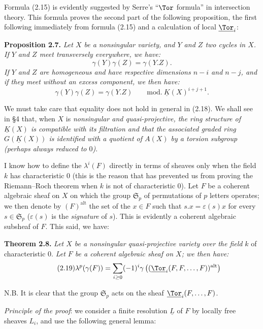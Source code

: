 Formula (2.15) is evidently suggested by Serre's ``$\Tor$ formula'' in intersection theory. This formula proves the second part of the following proposition, the first following immediately from formula (2.15) and a calculation of local $\underline{\Tor}_i$:

\textbf{Proposition 2.7.} \emph{Let $X$ be a nonsingular variety, and $Y$ and $Z$ two cycles in $X$. If $Y$ and $Z$ meet transversely everywhere, we have:}
\begin{equation}\tag{2.17}
 \gamma(Y)\gamma(Z)=\gamma(Y.Z).
\end{equation}
\emph{If $Y$ and $Z$ are homogeneous and have respective dimensions $n-i$ and $n-j$, and if they meet without an excess component, we then have:}
%
\begin{equation}\tag{2.18}
 \gamma(Y)\gamma(Z)=\gamma(Y.Z)\qquad\mathrm{mod.}\ \underline K(X)^{i+j+1}.
\end{equation}

We
must take care that equality does not hold in general in (2.18). We shall see in \S 4 that, when $X$ is \emph{nonsingular and quasi-projective, the ring structure of $\underline K(X)$ is compatible with its filtration and that the associated graded ring $G(\underline K(X))$ is identified with a quotient of $A(X)$ by a torsion subgroup (perhaps always reduced to $0$)}.

I know how to define the $\lambda^i(F)$ directly in terms of sheaves only when the field $k$ has characteristic $0$ (this is the reason that has prevented us from proving the Riemann--Roch theorem when $k$ is not of characteristic $0$). Let $F$ be a coherent algebraic sheaf on $X$ on which the group $\mathfrak S_p$ of permutations of $p$ letters operates; we then denote by $(F)^{\mathrm{alt}}$ the set of the $x\in F$ such that $s.x=\varepsilon(s)x$ for every $s\in\mathfrak S_p$ ($\varepsilon(s)$ is the \emph{signature} of $s$). This is evidently a coherent algebraic subsheaf of $F$. This said, we have:

\textbf{Theorem 2.8.} \emph{Let $X$ be a nonsingular quasi-projective variety over the field} $k$ of characteristic $0$. \emph{Let $F$ be a coherent algebraic sheaf on $X$; we then have:}
\begin{equation}\tag{2.19}
 \lambda^p(\gamma(F))=\sum_{i\geq0}(-1)^i\gamma\left((\underline{\Tor}_i(F,F,\ldots,F))^{\mathrm{alt}}\right)
\end{equation}

N.B. It is clear that the group $\mathfrak S_p$ acts on the sheaf $\underline{\Tor}_i(F,\ldots,F)$.

\emph{Principle of the proof}: we consider a finite resolution $\underline L$ of $F$ by locally free sheaves $L_i$, and use the following general lemma:

